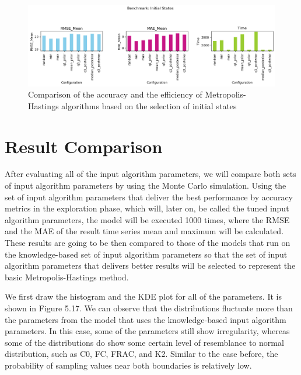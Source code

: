 \begin{figure}[H]
    \centering
    \includegraphics[width=1\textwidth]{figures/basic_mh/benchmark/init_method.png}
    \captionsetup{width=.8\textwidth}
    \caption{Comparison of the accuracy and the efficiency of Metropolis-Hastings algorithms based on the selection of initial states}
    \label{fig:enter-label}
\end{figure}


\section{Result Comparison}
After evaluating all of the input algorithm parameters, we will compare both sets of input algorithm parameters by using the Monte Carlo simulation. Using the set of input algorithm parameters that deliver the best performance by accuracy metrics in the exploration phase, which will, later on, be called the tuned input algorithm parameters, the model will be executed 1000 times, where the RMSE and the MAE of the result time series mean and maximum will be calculated. These results are going to be then compared to those of the models that run on the knowledge-based set of input algorithm parameters so that the set of input algorithm parameters that delivers better results will be selected to represent the basic Metropolis-Hastings method.

We first draw the histogram and the KDE plot for all of the parameters. It is shown in Figure 5.17. We can observe that the distributions fluctuate more than the parameters from the model that uses the knowledge-based input algorithm parameters. In this case, some of the parameters still show irregularity, whereas some of the distributions do show some certain level of resemblance to normal distribution, such as C0, FC, FRAC, and K2. Similar to the case before, the probability of sampling values near both boundaries is relatively low. 


